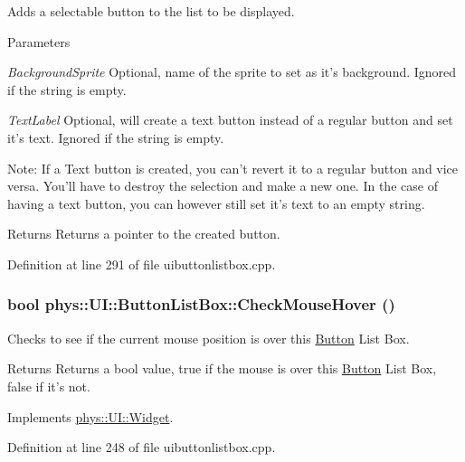 Adds a selectable button to the list to be displayed. 


\begin{DoxyParams}{Parameters}
\item[{\em BackgroundSprite}]Optional, name of the sprite to set as it's background. Ignored if the string is empty. \item[{\em TextLabel}]Optional, will create a text button instead of a regular button and set it's text. Ignored if the string is empty. \par
 \par
 Note: If a Text button is created, you can't revert it to a regular button and vice versa. You'll have to destroy the selection and make a new one. In the case of having a text button, you can however still set it's text to an empty string. \end{DoxyParams}
\begin{DoxyReturn}{Returns}
Returns a pointer to the created button. 
\end{DoxyReturn}


Definition at line 291 of file uibuttonlistbox.cpp.

\hypertarget{classphys_1_1UI_1_1ButtonListBox_aaa8b11b174a0475cadee3d3349ef1a58}{
\subsubsection[{CheckMouseHover}]{\setlength{\rightskip}{0pt plus 5cm}bool phys::UI::ButtonListBox::CheckMouseHover ()}}
\label{d4/dd7/classphys_1_1UI_1_1ButtonListBox_aaa8b11b174a0475cadee3d3349ef1a58}


Checks to see if the current mouse position is over this \hyperlink{classphys_1_1UI_1_1Button}{Button} List Box. 

\begin{DoxyReturn}{Returns}
Returns a bool value, true if the mouse is over this \hyperlink{classphys_1_1UI_1_1Button}{Button} List Box, false if it's not. 
\end{DoxyReturn}


Implements \hyperlink{classphys_1_1UI_1_1Widget_a613df6dbb42efe139d185043a00259dc}{phys::UI::Widget}.



Definition at line 248 of file uibuttonlistbox.cpp.

